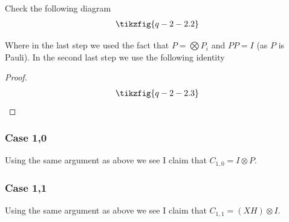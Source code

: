 Check the following diagram
\begin{align*}
	\tikzfig{q-2-2.2}
\end{align*}

Where in the last step we used the fact that $P = \bigotimes P_i$ and $PP = I$ (as $P$ is Pauli).
In the second last step we use the following identity


\begin{proof}
\begin{align*}
	\tikzfig{q-2-2.3}
\end{align*}
\end{proof}

\subsubsection{Case 1,0}

Using the same argument as above we see 
I claim that $C_{1,0} = I \otimes P$.

\subsubsection{Case 1,1}

Using the same argument as above we see 
I claim that $C_{1,1} = (X H) \otimes I$.
